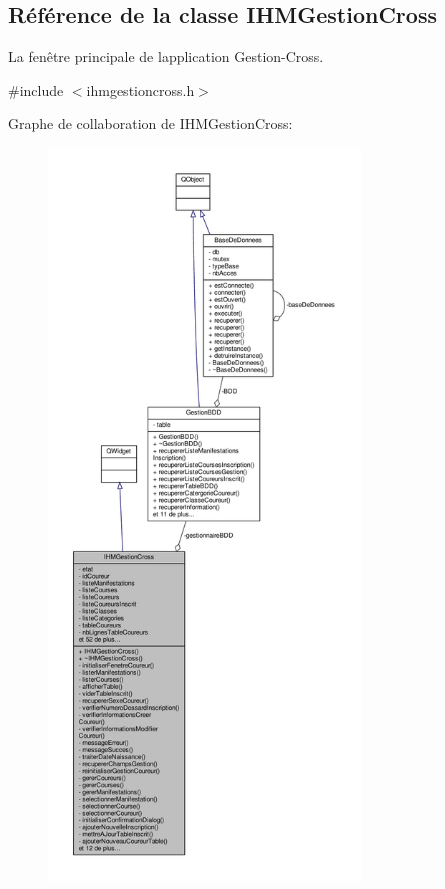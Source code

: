 \hypertarget{class_i_h_m_gestion_cross}{}\subsection{Référence de la classe I\+H\+M\+Gestion\+Cross}
\label{class_i_h_m_gestion_cross}


La fenêtre principale de l\textquotesingle{}application Gestion-\/\+Cross.  




{\ttfamily \#include $<$ihmgestioncross.\+h$>$}



Graphe de collaboration de I\+H\+M\+Gestion\+Cross\+:\nopagebreak
\begin{figure}[H]
\begin{center}
\leavevmode
\includegraphics[height=550pt]{class_i_h_m_gestion_cross__coll__graph}
\end{center}
\end{figure}
